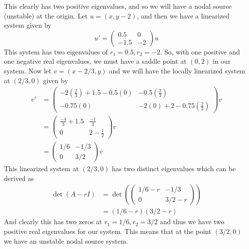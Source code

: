 \documentclass{article}
\theoremstyle{definition}
\begin{document}
        This clearly has two positive eigenvalues, and so we will have a nodal source 
        (unstable) at the origin. Let $u = (x, y-2)$, and then we have a linearized system 
        given by 
        \[
            u' = \begin{pmatrix}
                0.5 & 0 \\
                -1.5 & -2
            \end{pmatrix}   
            u
        \]
        This system has two eigenvalues of $r_1 = 0.5, r_2 = -2$. So, with one positive 
        and one negative real eigenvalues, we must have a saddle point at $(0,2)$ in our system.
        Now let $v = (x - 2/3, y)$ and we will have the locally linearized system at $(2/3, 0)$ given by 
        \begin{align*}
            v' &= \begin{pmatrix}
                -2(\frac{2}{3}) +1.5 - 0.5(0) & -0.5(\frac{2}{3}) \\
                -0.75(0) & -2(0) + 2 -0.75(\frac{2}{3})
            \end{pmatrix} v \\
            &= \begin{pmatrix}
                \frac{-4}{3} + 1.5 & \frac{-1}{3} \\
                0 & 2 - \frac{1}{2}
            \end{pmatrix} v \\
            &= \begin{pmatrix}
                1/6 & -1/3 \\
                0 & 3/2
            \end{pmatrix}
            v
        \end{align*}
        This linearized system at $(2/3, 0)$ has two distinct eigenvalues which can be derived as 
        \begin{align*}
            \det(A - rI) &= \det\left(
                \begin{pmatrix}
                    1/6 - r & -1/3\\
                    0 & 3/2 - r
                \end{pmatrix}
            \right)\\
            &= (1/6 - r)(3/2 - r)
        \end{align*}
        And clearly this has two zeros at $r_1 = 1/6, r_2 = 3/2$ and thus we have two 
        positive real eigenvalues for our system.
        This means that at the point $(3/2, 0)$ we have an unstable nodal source system.
\end{document}
